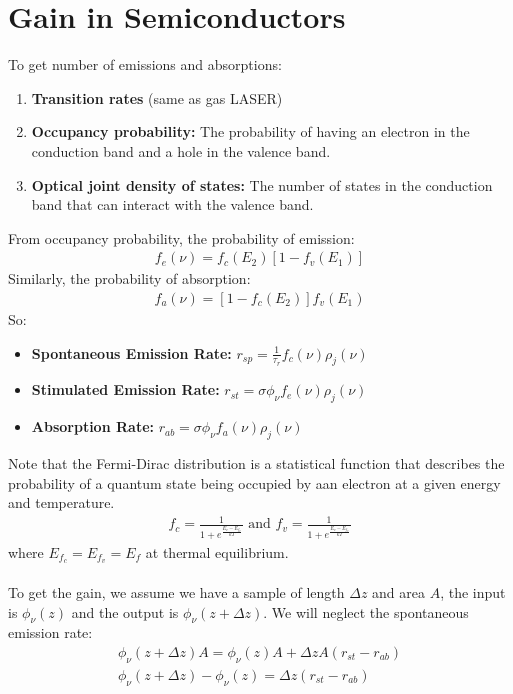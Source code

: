 \documentclass[11pt]{article}
\begin{document}
\section{Gain in Semiconductors}
To get number of emissions and absorptions:
\begin{enumerate}
    \item \textbf{Transition rates} (same as gas LASER)
    \item \textbf{Occupancy probability:} The probability of having an electron in the conduction band and a hole in the valence band.
    \item \textbf{Optical joint density of states:} The number of states in the conduction band that can interact with the valence band.
\end{enumerate}
From occupancy probability, the probability of emission:
\begin{align*}
    f_e (\nu) = f_c (E_2) [1 - f_v (E_1)]
\end{align*}
Similarly, the probability of absorption:
\begin{align*}
    f_a (\nu) = [1 - f_c (E_2)] f_v (E_1)
\end{align*}
So:
\begin{itemize}
    \item \textbf{Spontaneous Emission Rate:} $r_{sp} = \frac{1}{\tau_r} f_c(\nu) \rho_j (\nu)$
    \item \textbf{Stimulated Emission Rate:} $r_{st} = \sigma \phi_{\nu} f_e (\nu) \rho_j (\nu)$
    \item \textbf{Absorption Rate:} $r_{ab} = \sigma \phi_{\nu} f_a (\nu) \rho_j (\nu)$
\end{itemize}
Note that the Fermi-Dirac distribution is a statistical function that describes the probability of a quantum state being occupied by aan electron at a given energy and temperature. 
\begin{align*}
    f_c = \frac{1}{1 + e^{\frac{E_c - E_{f_c}}{kT}}} \text{ and } f_v = \frac{1}{1 + e^{\frac{E_v - E_{f_v}}{kT}}}
\end{align*}
where $E_{f_c} = E_{f_v} = E_f$ at thermal equilibrium. \\ \\
To get the gain, we assume we have a sample of length $\Delta z$ and area $A$, the input is $\phi_\nu (z)$ and the output is $\phi_\nu (z + \Delta z)$. We will neglect the spontaneous emission rate:
\begin{align*}
    \phi_\nu (z + \Delta z) A = \phi_\nu (z) A + \Delta z A (r_{st} - r_{ab}) \\
    \phi_\nu (z + \Delta z) - \phi_\nu (z) = \Delta z (r_{st} - r_{ab})
\end{align*}
\end{document}
